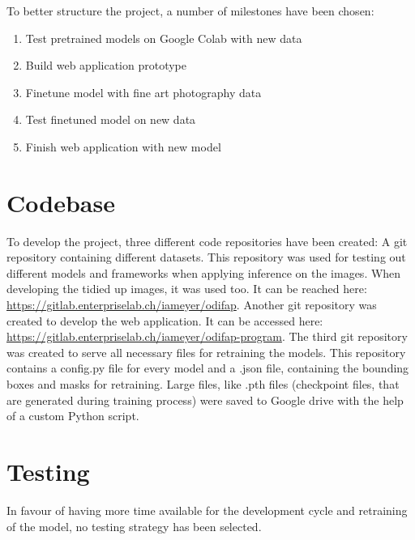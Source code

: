 To better structure the project, a number of milestones have been chosen:

\begin{enumerate}
	\item Test pretrained models on Google Colab with new data
	\item Build web application prototype
	\item Finetune model with fine art photography data
	\item Test finetuned model on new data
	\item Finish web application with new model
\end{enumerate}

\section{Codebase}

To develop the project, three different code repositories have been created: A git repository containing different datasets. This repository was used for testing out different models and frameworks when applying inference on the images. When developing the tidied up images, it was used too. It can be reached here: \url{https://gitlab.enterpriselab.ch/iameyer/odifap}.
Another git repository was created to develop the web application. It can be accessed here: \url{https://gitlab.enterpriselab.ch/iameyer/odifap-program}.
The third git repository was created to serve all necessary files for retraining the models. This repository contains a config.py file for every model and a .json file, containing the bounding boxes and masks for retraining.
Large files, like .pth files (checkpoint files, that are generated during training process) were saved to Google drive with the help of a custom Python script.

\section{Testing}

In favour of having more time available for the development cycle and retraining of the model, no testing strategy has been selected.